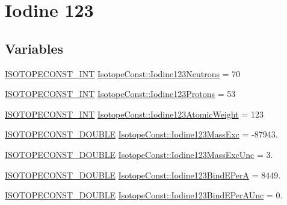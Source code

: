 \hypertarget{group___isotope_const-_iodine-_i123}{}\section{Iodine 123}
\label{group___isotope_const-_iodine-_i123}
\subsection*{Variables}
\begin{DoxyCompactItemize}
\item 
\mbox{\hyperlink{group___isotope_const-_macros_ga5f18360b3e99483a35c32d789e62621c}{I\+S\+O\+T\+O\+P\+E\+C\+O\+N\+S\+T\+\_\+\+I\+NT}} \mbox{\hyperlink{group___isotope_const-_iodine-_i123_ga46ecaea3f74519bb03cd809b7b3eee8c}{Isotope\+Const\+::\+Iodine123\+Neutrons}} = 70
\item 
\mbox{\hyperlink{group___isotope_const-_macros_ga5f18360b3e99483a35c32d789e62621c}{I\+S\+O\+T\+O\+P\+E\+C\+O\+N\+S\+T\+\_\+\+I\+NT}} \mbox{\hyperlink{group___isotope_const-_iodine-_i123_ga675b0b30e39442383e8cfe364dff08d1}{Isotope\+Const\+::\+Iodine123\+Protons}} = 53
\item 
\mbox{\hyperlink{group___isotope_const-_macros_ga5f18360b3e99483a35c32d789e62621c}{I\+S\+O\+T\+O\+P\+E\+C\+O\+N\+S\+T\+\_\+\+I\+NT}} \mbox{\hyperlink{group___isotope_const-_iodine-_i123_gad55c3620733826b0dccbed8690d6364b}{Isotope\+Const\+::\+Iodine123\+Atomic\+Weight}} = 123
\item 
\mbox{\hyperlink{group___isotope_const-_macros_ga8f45a7272ce02c0b4c65c44636ed719a}{I\+S\+O\+T\+O\+P\+E\+C\+O\+N\+S\+T\+\_\+\+D\+O\+U\+B\+LE}} \mbox{\hyperlink{group___isotope_const-_iodine-_i123_gaed681542faf54cb59eddd01bff04bb69}{Isotope\+Const\+::\+Iodine123\+Mass\+Exc}} = -\/87943.
\item 
\mbox{\hyperlink{group___isotope_const-_macros_ga8f45a7272ce02c0b4c65c44636ed719a}{I\+S\+O\+T\+O\+P\+E\+C\+O\+N\+S\+T\+\_\+\+D\+O\+U\+B\+LE}} \mbox{\hyperlink{group___isotope_const-_iodine-_i123_gad859fe5665679d5cca1a40f3a4202cb1}{Isotope\+Const\+::\+Iodine123\+Mass\+Exc\+Unc}} = 3.
\item 
\mbox{\hyperlink{group___isotope_const-_macros_ga8f45a7272ce02c0b4c65c44636ed719a}{I\+S\+O\+T\+O\+P\+E\+C\+O\+N\+S\+T\+\_\+\+D\+O\+U\+B\+LE}} \mbox{\hyperlink{group___isotope_const-_iodine-_i123_ga54ef44b5077f384fe2d5ae6127933c7e}{Isotope\+Const\+::\+Iodine123\+Bind\+E\+PerA}} = 8449.
\item 
\mbox{\hyperlink{group___isotope_const-_macros_ga8f45a7272ce02c0b4c65c44636ed719a}{I\+S\+O\+T\+O\+P\+E\+C\+O\+N\+S\+T\+\_\+\+D\+O\+U\+B\+LE}} \mbox{\hyperlink{group___isotope_const-_iodine-_i123_ga41f485e9ff870b0d8ea55a97c5feddcc}{Isotope\+Const\+::\+Iodine123\+Bind\+E\+Per\+A\+Unc}} = 0.

\end{DoxyCompactItemize}
